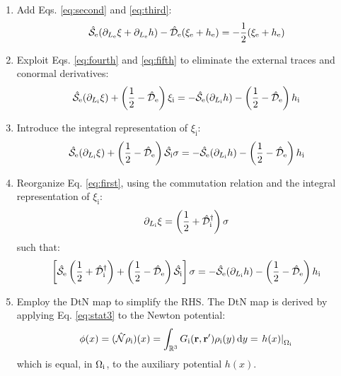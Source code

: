 \begin{enumerate}
  \item Add Eqs. \eqref{eq:second} and \eqref{eq:third}:
    \begin{equation}
    \hat{\mathcal{S}}_\mathrm{e}(\partial_{L_\mathrm{e}} \xi + \partial_{L_\mathrm{e}} h) -
    \hat{\mathcal{D}}_\mathrm{e}(\xi_\mathrm{e} + h_\mathrm{e})
    = -\frac{1}{2}(\xi_\mathrm{e} + h_\mathrm{e})
    \end{equation}
  \item Exploit Eqs. \eqref{eq:fourth} and \eqref{eq:fifth} to
    eliminate the external traces and conormal derivatives:
    \begin{equation}
      \hat{\mathcal{S}}_\mathrm{e}(\partial_{L_\mathrm{i}} \xi) + \left(\frac{1}{2} -
      \hat{\mathcal{D}}_\mathrm{e}\right)\xi_\mathrm{i} =
      - \hat{\mathcal{S}}_\mathrm{e}(\partial_{L_\mathrm{i}} h) - \left(\frac{1}{2} -
      \hat{\mathcal{D}}_\mathrm{e}\right)h_\mathrm{i}
    \end{equation}
  \item Introduce the integral representation of
    $\xi_\mathrm{i}$:
    \begin{equation}
      \hat{\mathcal{S}}_\mathrm{e}(\partial_{L_\mathrm{i}} \xi) + \left(\frac{1}{2} -
      \hat{\mathcal{D}}_\mathrm{e}\right)\hat{\mathcal{S}}_\mathrm{i}\sigma =
      - \hat{\mathcal{S}}_\mathrm{e}(\partial_{L_\mathrm{i}} h) - \left(\frac{1}{2} -
      \hat{\mathcal{D}}_\mathrm{e}\right)h_\mathrm{i}
    \end{equation}
  \item Reorganize Eq. \eqref{eq:first}, using the commutation
    relation and the integral representation of $\xi_\mathrm{i}$:
    \begin{equation}
    \partial_{L_\mathrm{i}} \xi = \left(\frac{1}{2} + \hat{\mathcal{D}}^\dagger_\mathrm{i}\right)\sigma
    \end{equation}
    such that:
    \begin{equation}
      \left[ \hat{\mathcal{S}}_\mathrm{e}\left(\frac{1}{2} + \hat{\mathcal{D}}^\dagger_\mathrm{i}\right)
      +
      \left(\frac{1}{2} - \hat{\mathcal{D}}_\mathrm{e}\right)\hat{\mathcal{S}}_\mathrm{i}
      \right]\sigma =
      - \hat{\mathcal{S}}_\mathrm{e}(\partial_{L_\mathrm{i}} h) - \left(\frac{1}{2} -
      \hat{\mathcal{D}}_\mathrm{e}\right)h_\mathrm{i}
    \end{equation}
  \item Employ the \ac{DtN} map to simplify
    the RHS. The \acs{DtN} map is derived by applying Eq. \eqref{eq:stat3} to
    the Newton potential:
    \begin{equation}
      \phi(x) = (\hat{\mathcal{N}}\rho_\mathrm{i})(x) = \int_{\mathbb{R}^3}G_\mathrm{i}(\mathbf{r}, \mathbf{r}^\prime)\rho_\mathrm{i}(y)\mathop{}\!\mathrm{d} y
      = \left.h(x)\right|_{\Omega_\mathrm{i}}
    \end{equation}
    which is equal, in $\Omega_\mathrm{i}$, to the auxiliary potential $h(x)$.

\end{enumerate}
